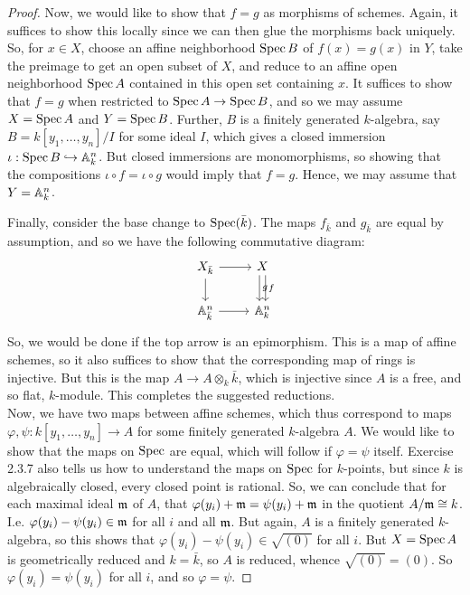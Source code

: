 \begin{proof}
	Now, we would like to show that $f = g$ as morphisms of schemes. Again, it suffices to show this locally since we can then glue the morphisms back uniquely. So, for $x \in X$, choose an affine neighborhood $\Spec B$ of $f(x) = g(x)$ in $Y$, take the preimage to get an open subset of $X$, and reduce to an affine open neighborhood $\Spec A$ contained in this open set containing $x$. It suffices to show that $f = g$ when restricted to $\Spec A \to \Spec B$, and so we may assume $X = \Spec A$ and $Y = \Spec B$. Further, $B$ is a finitely generated $k$-algebra, say $B = k[y_1,\ldots,y_n]/I$ for some ideal $I$, which gives a closed immersion $\iota : \Spec B \hookrightarrow \AA_k^n$. But closed immersions are monomorphisms, so showing that the compositions $\iota \circ f = \iota \circ g$ would imply that $f = g$. Hence, we may assume that $Y = \AA_k^n$.
	
	Finally, consider the base change to $\Spec(\bar{k})$. The maps $f_{\bar{k}}$ and $g_{\bar{k}}$ are equal by assumption, and so we have the following commutative diagram:
	\[ \begin{tikzcd} X_{\bar{k}} \arrow[r] \arrow[d] & X \arrow[d,shift left,"f"] \arrow[d, shift right,"g"] \\ \AA_{\bar{k}}^n \arrow[r] & \AA_k^n \end{tikzcd} \]
	So, we would be done if the top arrow is an epimorphism. This is a map of affine schemes, so it also suffices to show that the corresponding map of rings is injective. But this is the map $A \to A \otimes_k \bar{k}$, which is injective since $A$ is a free, and so flat, $k$-module. This completes the suggested reductions. \\
	
	Now, we have two maps between affine schemes, which thus correspond to maps $\varphi,\psi : k[y_1,\ldots,y_n] \to A$ for some finitely generated $k$-algebra $A$. We would like to show that the maps on $\Spec$ are equal, which will follow if $\varphi = \psi$ itself. Exercise 2.3.7 also tells us how to understand the maps on $\Spec$ for $k$-points, but since $k$ is algebraically closed, every closed point is rational. So, we can conclude that for each maximal ideal $\frm$ of $A$, that $\varphi(y_i) + \frm = \psi(y_i) + \frm$ in the quotient $A/\frm \cong k$. I.e. $\varphi(y_i) - \psi(y_i) \in \frm$ for all $i$ and all $\frm$. But again, $A$ is a finitely generated $k$-algebra, so this shows that $\varphi(y_i) - \psi(y_i) \in \sqrt{(0)}$ for all $i$. But $X = \Spec A$ is geometrically reduced and $k = \bar{k}$, so $A$ is reduced, whence $\sqrt{(0)} = (0)$. So $\varphi(y_i) = \psi(y_i)$ for all $i$, and so $\varphi = \psi$.
\end{proof}
